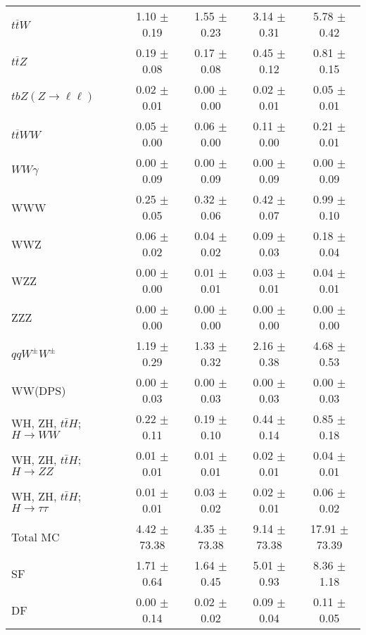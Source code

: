 \begin{tabular}{l|cccc}
                   $t\overline{t}W$ &  1.10 $\pm$  0.19 &  1.55 $\pm$  0.23 &  3.14 $\pm$  0.31 &  5.78 $\pm$  0.42 \\
                   $t\overline{t}Z$ &  0.19 $\pm$  0.08 &  0.17 $\pm$  0.08 &  0.45 $\pm$  0.12 &  0.81 $\pm$  0.15 \\
    $tbZ (Z \rightarrow \ell \ell)$ &  0.02 $\pm$  0.01 &  0.00 $\pm$  0.00 &  0.02 $\pm$  0.01 &  0.05 $\pm$  0.01 \\
                  $t\overline{t}WW$ &  0.05 $\pm$  0.00 &  0.06 $\pm$  0.00 &  0.11 $\pm$  0.00 &  0.21 $\pm$  0.01 \\
                         $WW\gamma$ &  0.00 $\pm$  0.09 &  0.00 $\pm$  0.09 &  0.00 $\pm$  0.09 &  0.00 $\pm$  0.09 \\
                                WWW &  0.25 $\pm$  0.05 &  0.32 $\pm$  0.06 &  0.42 $\pm$  0.07 &  0.99 $\pm$  0.10 \\
                                WWZ &  0.06 $\pm$  0.02 &  0.04 $\pm$  0.02 &  0.09 $\pm$  0.03 &  0.18 $\pm$  0.04 \\
                                WZZ &  0.00 $\pm$  0.00 &  0.01 $\pm$  0.01 &  0.03 $\pm$  0.01 &  0.04 $\pm$  0.01 \\
                                ZZZ &  0.00 $\pm$  0.00 &  0.00 $\pm$  0.00 &  0.00 $\pm$  0.00 &  0.00 $\pm$  0.00 \\
                 $qqW^{\pm}W^{\pm}$ &  1.19 $\pm$  0.29 &  1.33 $\pm$  0.32 &  2.16 $\pm$  0.38 &  4.68 $\pm$  0.53 \\
                            WW(DPS) &  0.00 $\pm$  0.03 &  0.00 $\pm$  0.03 &  0.00 $\pm$  0.03 &  0.00 $\pm$  0.03 \\
WH, ZH, $t\bar{t}H$; $H \rightarrow WW$ &  0.22 $\pm$  0.11 &  0.19 $\pm$  0.10 &  0.44 $\pm$  0.14 &  0.85 $\pm$  0.18 \\
WH, ZH, $t\bar{t}H$; $H \rightarrow ZZ$ &  0.01 $\pm$  0.01 &  0.01 $\pm$  0.01 &  0.02 $\pm$  0.01 &  0.04 $\pm$  0.01 \\
WH, ZH, $t\bar{t}H$; $H \rightarrow \tau\tau$ &  0.01 $\pm$  0.01 &  0.03 $\pm$  0.02 &  0.02 $\pm$  0.01 &  0.06 $\pm$  0.02 \\
\hline\hline
                           Total MC &  4.42 $\pm$ 73.38 &  4.35 $\pm$ 73.38 &  9.14 $\pm$ 73.38 & 17.91 $\pm$ 73.39 \\
\hline
                                 SF &  1.71 $\pm$  0.64 &  1.64 $\pm$  0.45 &  5.01 $\pm$  0.93 &  8.36 $\pm$  1.18 \\
                                 DF &  0.00 $\pm$  0.14 &  0.02 $\pm$  0.02 &  0.09 $\pm$  0.04 &  0.11 $\pm$  0.05 \\

\end{tabular}
